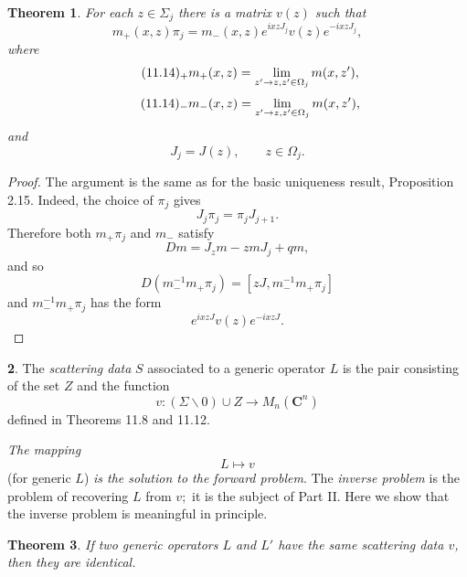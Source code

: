 \documentclass{surv-l}
\theoremstyle{plain}
\newtheorem{theorem}{Theorem}[section]
\theoremstyle{definition}
\newtheorem{definition}[theorem]{\sc{Definition}}
\numberwithin{equation}{chapter}
\begin{document}
\begin{theorem}\label{thm11.12}
For each $z\in\Sigma_{j}$  there is a matrix $v(z)$  such that
\setcounter{equation}{12}
\begin{equation}\label{eq11.13}
m_{+}(x,z)\pi_{j}=m_{-}(x, z)e^{ixzJ_{j}}v(z)e^{-ixzJ_{j}},
\end{equation}
where
\begin{equation*}
\tag*{$(11.14)_{+}$} m_{+}(x,z) = \lim_{z'\rightarrow z,z'\in\Omega_{j}}m(x, z'),
\end{equation*}
\begin{equation*}
\tag*{$(11.14)_{-}$} m_{-}(x, z)=\lim_{z'\rightarrow z,z'\in\Omega_{j}}m(x,z'),
\end{equation*}
and
\setcounter{equation}{14}
\begin{equation}\label{eq11.15}
J_{j}=J(z),\qquad z\in\Omega_{j}.
\end{equation}
\end{theorem}

\begin{proof} The argument is the same as for the basic uniqueness result, Proposition 2.15. Indeed, the choice of $\pi_{j}$ gives
\begin{equation}\label{eq11.16}
J_{j}\pi_{j}=\pi_{j}J_{j+1}.
\end{equation}
Therefore both $m_{+}\pi_{j}$ and $m_{-}$ satisfy
\begin{equation*}
Dm=J_{z}m-zmJ_{j}+qm,
\end{equation*}
and so
\begin{equation*}
D(m_{-}^{-1}m_{+}\pi_{j})=[zJ, m_{-}^{-1}m_{+}\pi_{j}]
\end{equation*}
and $m_{-}^{-1}m_{+}\pi_{j}$ has the form
\begin{equation*}
e^{ixzJ}v(z)e^{-ixzJ}.
\end{equation*}
\end{proof}
\setcounter{theorem}{16}
\begin{definition}\label{defi11.17} The \emph{scattering data} $S$ associated to a generic operator $L$ is the pair consisting of the set $Z$ and the function
\begin{equation*}
v:(\Sigma\backslash 0)\cup Z\rightarrow M_{n}(\mathbf{C}^{n})
\end{equation*}
defined in Theorems 11.8 and 11.12.

\emph{The mapping}
\begin{equation*}
L\mapsto v
\end{equation*}
(for generic $L$) \emph{is the solution to the forward problem}. The \emph{inverse problem} is the problem of recovering $L$ from $v;$ it is the subject of Part II. Here we show that the inverse problem is meaningful in principle.
\end{definition}
\setcounter{theorem}{17}
\begin{theorem}\label{thm11.18}
If two generic operators $L$ and $L'$ have the same scattering data $v$, then they are identical.
\end{theorem}
\end{document}
